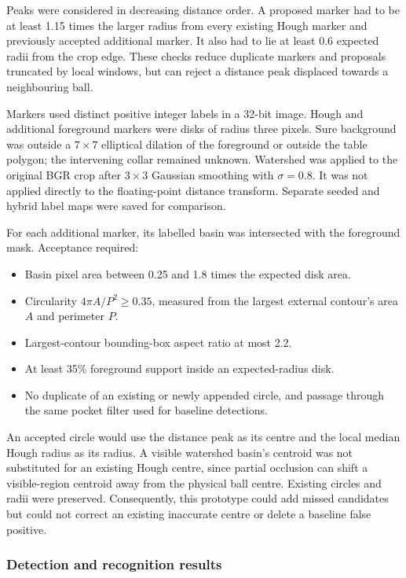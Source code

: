Peaks were considered in decreasing distance order. A proposed marker
had to be at least 1.15 times the larger radius from every existing
Hough marker and previously accepted additional marker. It also had
to lie at least 0.6 expected radii from the crop edge. These checks
reduce duplicate markers and proposals truncated by local windows, but
can reject a distance peak displaced towards a neighbouring ball.

Markers used distinct positive integer labels in a 32-bit image. Hough
and additional foreground markers were disks of radius three pixels.
Sure background was outside a $7\times7$ elliptical dilation of the
foreground or outside the table polygon; the intervening collar remained
unknown. Watershed was applied to the original BGR crop after
$3\times3$ Gaussian smoothing with $\sigma=0.8$. It was not applied
directly to the floating-point distance transform. Separate seeded and
hybrid label maps were saved for comparison.

For each additional marker, its labelled basin was intersected with the
foreground mask. Acceptance required:
\begin{itemize}
\item Basin pixel area between 0.25 and 1.8 times the expected disk area.
\item Circularity $4\pi A/P^2\geq0.35$, measured from the largest external
contour's area $A$ and perimeter $P$.
\item Largest-contour bounding-box aspect ratio at most 2.2.
\item At least 35\% foreground support inside an expected-radius disk.
\item No duplicate of an existing or newly appended circle, and passage
through the same pocket filter used for baseline detections.
\end{itemize}

An accepted circle would use the distance peak as its centre and the
local median Hough radius as its radius. A visible watershed basin's
centroid was not substituted for an existing Hough centre, since partial
occlusion can shift a visible-region centroid away from the physical
ball centre. Existing circles and radii were preserved. Consequently,
this prototype could add missed candidates but could not correct an
existing inaccurate centre or delete a baseline false positive.

\subsubsection{Detection and recognition results}

